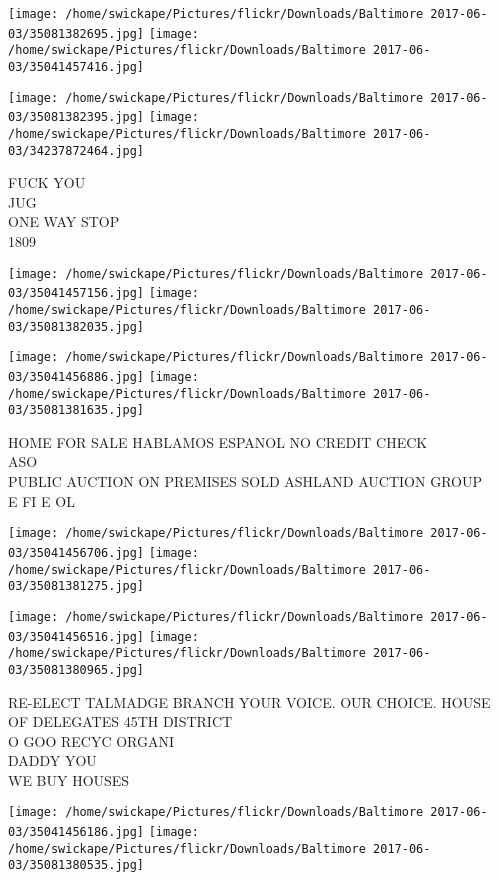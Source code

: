 \documentclass[10pt,letterpaper]{article}
\begin{document}
\texttt{[image: /home/swickape/Pictures/flickr/Downloads/Baltimore 2017-06-03/35081382695.jpg]}
\texttt{[image: /home/swickape/Pictures/flickr/Downloads/Baltimore 2017-06-03/35041457416.jpg]}

\texttt{[image: /home/swickape/Pictures/flickr/Downloads/Baltimore 2017-06-03/35081382395.jpg]}
\texttt{[image: /home/swickape/Pictures/flickr/Downloads/Baltimore 2017-06-03/34237872464.jpg]}

FUCK YOU\\
JUG\\
ONE WAY STOP\\
1809
\pagebreak

\texttt{[image: /home/swickape/Pictures/flickr/Downloads/Baltimore 2017-06-03/35041457156.jpg]}
\texttt{[image: /home/swickape/Pictures/flickr/Downloads/Baltimore 2017-06-03/35081382035.jpg]}

\texttt{[image: /home/swickape/Pictures/flickr/Downloads/Baltimore 2017-06-03/35041456886.jpg]}
\texttt{[image: /home/swickape/Pictures/flickr/Downloads/Baltimore 2017-06-03/35081381635.jpg]}

HOME FOR SALE HABLAMOS ESPANOL NO CREDIT CHECK\\
ASO\\
PUBLIC AUCTION ON PREMISES SOLD ASHLAND AUCTION GROUP\\
E FI E OL
\pagebreak

\texttt{[image: /home/swickape/Pictures/flickr/Downloads/Baltimore 2017-06-03/35041456706.jpg]}
\texttt{[image: /home/swickape/Pictures/flickr/Downloads/Baltimore 2017-06-03/35081381275.jpg]}

\texttt{[image: /home/swickape/Pictures/flickr/Downloads/Baltimore 2017-06-03/35041456516.jpg]}
\texttt{[image: /home/swickape/Pictures/flickr/Downloads/Baltimore 2017-06-03/35081380965.jpg]}

RE{-}ELECT TALMADGE BRANCH YOUR VOICE.  OUR CHOICE.  HOUSE OF DELEGATES 45TH DISTRICT\\
O GOO RECYC ORGANI\\
DADDY YOU\\
WE BUY HOUSES
\pagebreak

\texttt{[image: /home/swickape/Pictures/flickr/Downloads/Baltimore 2017-06-03/35041456186.jpg]}
\texttt{[image: /home/swickape/Pictures/flickr/Downloads/Baltimore 2017-06-03/35081380535.jpg]}
\end{document}
